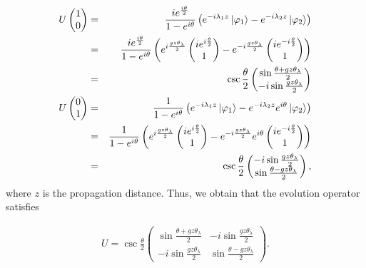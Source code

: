 \documentclass[%
reprint,
superscriptaddress,
amsthm,amsmath,amssymb,
aps,
]{revtex4-1}
\begin{document}
\begin{eqnarray}
	U\begin{pmatrix} 1 \\ 0	\end{pmatrix}&=&\frac{i e^{\frac{i \theta}{2}}}{ 1-e^{i \theta}} \left( e^{-i \lambda_{1}z}\ket{\varphi_{1}} -e^{-i \lambda_{2}z}\ket{\varphi_{2}}\right)\nonumber\\
	&=& \frac{i e^{\frac{i \theta}{2}}}{ 1-e^{i \theta}} \left( e^{i \frac{gz \theta_{\lambda}}{2}}\begin{pmatrix}
		i e^{i \frac{\theta}{2}} \\ 1	\end{pmatrix} - e^{-i \frac{gz \theta_{\lambda}}{2}}\begin{pmatrix} i e^{-i \frac{\theta}{2}} \\ 1	\end{pmatrix}\right)\nonumber\\&=&\csc\frac{\theta}{2}\begin{pmatrix} \sin \frac{\theta+gz\theta_{\lambda}}{2} \\ -i \sin \frac{gz\theta_{\lambda}}{2} \end{pmatrix}\nonumber\\
	U\begin{pmatrix} 0 \\ 1	\end{pmatrix}&=&\frac{1}{ 1-e^{i \theta}} \left( e^{-i \lambda_{1}z} \ket{\varphi_{1}} - e^{-i \lambda_{2}z} e^{i \theta} \ket{\varphi_{2}}\right)\nonumber\\
	&=& \frac{1}{ 1-e^{i \theta}} \left(  e^{i \frac{gz \theta_{\lambda}}{2}}\begin{pmatrix}
		i e^{i \frac{\theta}{2}} \\ 1	\end{pmatrix} -e^{-i \frac{gz \theta_{\lambda}}{2}}  e^{i \theta} \begin{pmatrix} i e^{-i \frac{\theta}{2}} \\ 1	\end{pmatrix}\right)\nonumber\\&=&\csc\frac{\theta}{2}\begin{pmatrix}	-i \sin \frac{gz\theta_{\lambda}}{2} \\ \sin \frac{\theta-gz\theta_{\lambda}}{2} \end{pmatrix},
\end{eqnarray}
where $z$ is the propagation distance. Thus, we obtain that the evolution operator satisfies

\begin{eqnarray}
	U= \csc\frac{\theta}{2}\begin{pmatrix} \sin \frac{\theta+gz\theta_{\lambda}}{2} & -i \sin \frac{gz\theta_{\lambda}}{2} \\	-i \sin \frac{gz\theta_{\lambda}}{2} & \sin \frac{\theta-gz\theta_{\lambda}}{2} \end{pmatrix} \label{66}.
\end{eqnarray}
\end{document}
